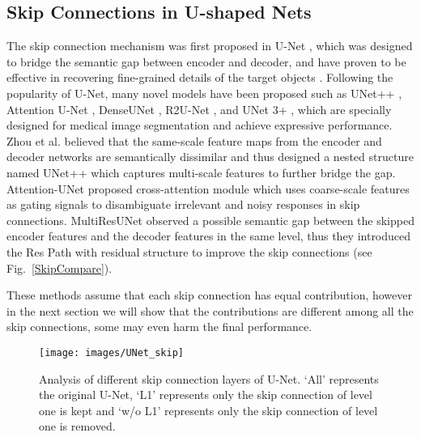 \documentclass[letterpaper]{article} \usepackage{aaai22}  \usepackage{times}  \usepackage{helvet}  \usepackage{courier}  \usepackage[hyphens]{url}  \usepackage{graphicx} \urlstyle{rm} \def\UrlFont{\rm}  \usepackage{natbib}  \usepackage{caption} \DeclareCaptionStyle{ruled}{labelfont=normalfont,labelsep=colon,strut=off} \frenchspacing  \setlength{\pdfpagewidth}{8.5in}  \setlength{\pdfpageheight}{11in}  \usepackage{algorithm}
\begin{document}
	
	
	\subsection{Skip Connections in U-shaped Nets}
	
The skip connection mechanism was first proposed in U-Net \cite{UNetConvolutionalNetworks_2015}, which was designed to bridge the semantic gap between encoder and decoder, and have proven to be effective in recovering fine-grained details of the target objects \cite{ImportanceSkipConnections_2016,DeepResidualLearning_2016a, DenselyConnectedConvolutional_2017}.
	Following the popularity of U-Net, many novel models have been proposed such as UNet++ \cite{UNetNestedUNet_2018}, Attention U-Net \cite{AttentionUNetLearning_2018}, DenseUNet \cite{HDenseUNetHybridDensely_2018}, R2U-Net \cite{RecurrentResidualConvolutional_2018a}, and UNet 3+ \cite{UNetFullScaleConnected_2020}, which are specially designed for medical image segmentation and achieve expressive performance.
	Zhou et al. \cite{UNetNestedUNet_2018} believed that the same-scale feature maps from the encoder and decoder networks are semantically dissimilar and thus designed a nested structure named UNet++ which captures multi-scale features to further bridge the gap.
	Attention-UNet proposed cross-attention module which uses coarse-scale features as gating signals to disambiguate irrelevant and noisy responses in skip connections. 
	MultiResUNet \cite{MultiResUNetRethinkingUNet_2020} observed a possible semantic gap between the skipped encoder features and the decoder features in the same level, thus they introduced the Res Path with residual structure to improve the skip connections (see Fig.~\ref{SkipCompare}).
	
	These methods assume that each skip connection has equal contribution, however in the next section we will show that the contributions are different among all the skip connections, some may even harm the final performance.
	
	
	
	
	
	
	
	
	
	
	
	\begin{figure}[t]
		\centering
		\texttt{[image: images/UNet\_skip]} \caption{Analysis of different skip connection layers of U-Net. `All' represents the original U-Net, `L1' represents only the skip connection of level one is kept and `w/o L1' represents only the skip connection of level one is removed.}
		\label{skip}
	\end{figure}
	
\end{document}
